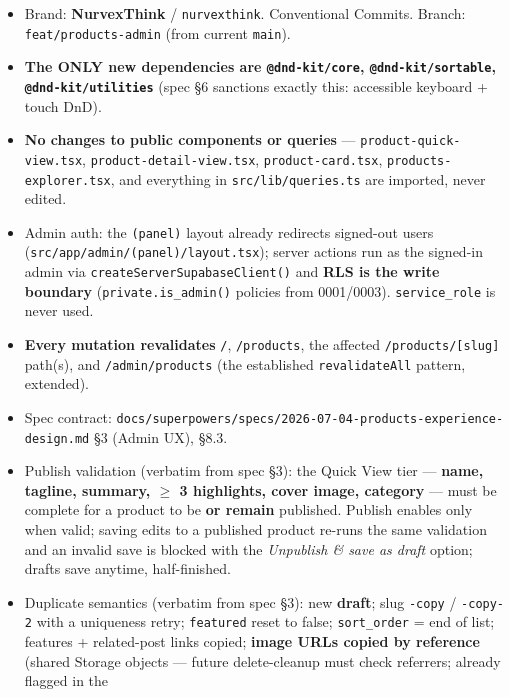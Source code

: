 \documentclass[11pt,a4paper]{article}
\begin{document}
\begin{itemize}
  \item Brand: \textbf{NurvexThink} / \texttt{nurvexthink}. Conventional Commits. Branch:
        \texttt{feat/products-admin} (from current \texttt{main}).
  \item \textbf{The ONLY new dependencies are \texttt{@dnd-kit/core}, \texttt{@dnd-kit/sortable},
        \texttt{@dnd-kit/utilities}} (spec \S6 sanctions exactly this: accessible keyboard + touch DnD).
  \item \textbf{No changes to public components or queries} --- \texttt{product-quick-view.tsx},
        \texttt{product-detail-view.tsx}, \texttt{product-card.tsx}, \texttt{products-explorer.tsx}, and
        everything in \texttt{src/lib/queries.ts} are imported, never edited.
  \item Admin auth: the \texttt{(panel)} layout already redirects signed-out users
        (\texttt{src/app/admin/(panel)/layout.tsx}); server actions run as the signed-in admin via
        \texttt{createServerSupabaseClient()} and \textbf{RLS is the write boundary}
        (\texttt{private.is\_admin()} policies from 0001/0003). \texttt{service\_role} is never used.
  \item \textbf{Every mutation revalidates} \texttt{/}, \texttt{/products}, the affected
        \texttt{/products/[slug]} path(s), and \texttt{/admin/products} (the established
        \texttt{revalidateAll} pattern, extended).
  \item Spec contract: \texttt{docs/superpowers/specs/2026-07-04-products-experience-design.md}
        \S3 (Admin UX), \S8.3.
  \item Publish validation (verbatim from spec \S3): the Quick View tier --- \textbf{name, tagline,
        summary, $\geq$ 3 highlights, cover image, category} --- must be complete for a product to be
        \textbf{or remain} published. Publish enables only when valid; saving edits to a published
        product re-runs the same validation and an invalid save is blocked with the \textit{Unpublish \&
        save as draft} option; drafts save anytime, half-finished.
  \item Duplicate semantics (verbatim from spec \S3): new \textbf{draft}; slug \texttt{-copy} /
        \texttt{-copy-2} with a uniqueness retry; \texttt{featured} reset to false; \texttt{sort\_order} =
        end of list; features + related-post links copied; \textbf{image URLs copied by reference}
        (shared Storage objects --- future delete-cleanup must check referrers; already flagged in the

\end{itemize}
\end{document}
